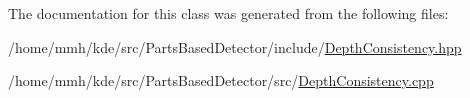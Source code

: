 The documentation for this class was generated from the following files\-:\begin{DoxyCompactItemize}
\item 
/home/mmh/kde/src/\-Parts\-Based\-Detector/include/\hyperlink{DepthConsistency_8hpp}{Depth\-Consistency.\-hpp}\item 
/home/mmh/kde/src/\-Parts\-Based\-Detector/src/\hyperlink{DepthConsistency_8cpp}{Depth\-Consistency.\-cpp}\end{DoxyCompactItemize}
